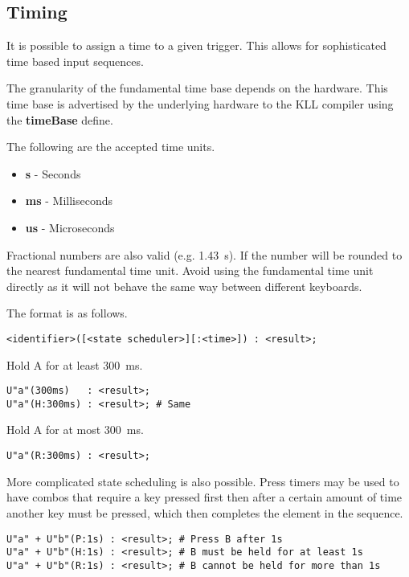 \documentclass{kiibohd-template}
\begin{document}
\subsection{Timing}
\label{subsec:trigtiming}

It is possible to assign a time to a given trigger.
This allows for sophisticated time based input sequences.

The granularity of the fundamental time base depends on the hardware.
This time base is advertised by the underlying hardware to the KLL compiler using the \textbf{timeBase} define.

The following are the accepted time units.
\begin{itemize}
	\item \textbf{s} - Seconds
	\item \textbf{ms} - Milliseconds
	\item \textbf{us} - Microseconds
\end{itemize}

Fractional numbers are also valid (e.g. 1.43~s).
If the number will be rounded to the nearest fundamental time unit.
Avoid using the fundamental time unit directly as it will not behave the same way between different keyboards.

The format is as follows.

\begin{lstlisting}
<identifier>([<state scheduler>][:<time>]) : <result>;
\end{lstlisting}

Hold A for at least 300~ms.

\begin{lstlisting}
U"a"(300ms)   : <result>;
U"a"(H:300ms) : <result>; # Same
\end{lstlisting}

Hold A for at most 300~ms.

\begin{lstlisting}
U"a"(R:300ms) : <result>;
\end{lstlisting}

More complicated state scheduling is also possible.
Press timers may be used to have combos that require a key pressed first then after a certain amount of time another key must be pressed, which then completes the element in the sequence.

\begin{lstlisting}
U"a" + U"b"(P:1s) : <result>; # Press B after 1s
U"a" + U"b"(H:1s) : <result>; # B must be held for at least 1s
U"a" + U"b"(R:1s) : <result>; # B cannot be held for more than 1s
\end{lstlisting}
\end{document}
